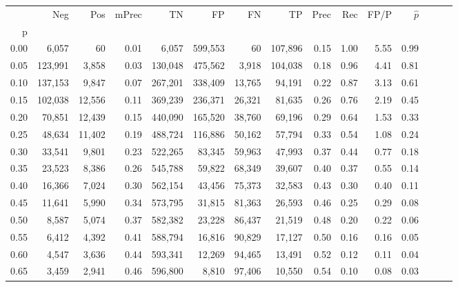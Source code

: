 \begin{tabular}{rrrrrrrrrrrrrrr}
\toprule
{} &      Neg &     Pos & mPrec &       TN &       FP &       FN &       TP &  Prec &   Rec &  FP/P & $\hat{p}$ \\
p    &          &         &       &          &          &          &          &       &       &       &           \\
\midrule
0.00 &    6,057 &      60 &  0.01 &    6,057 &  599,553 &       60 &  107,896 &  0.15 &  1.00 &  5.55 &      0.99 \\
0.05 &  123,991 &   3,858 &  0.03 &  130,048 &  475,562 &    3,918 &  104,038 &  0.18 &  0.96 &  4.41 &      0.81 \\
0.10 &  137,153 &   9,847 &  0.07 &  267,201 &  338,409 &   13,765 &   94,191 &  0.22 &  0.87 &  3.13 &      0.61 \\
0.15 &  102,038 &  12,556 &  0.11 &  369,239 &  236,371 &   26,321 &   81,635 &  0.26 &  0.76 &  2.19 &      0.45 \\
0.20 &   70,851 &  12,439 &  0.15 &  440,090 &  165,520 &   38,760 &   69,196 &  0.29 &  0.64 &  1.53 &      0.33 \\
0.25 &   48,634 &  11,402 &  0.19 &  488,724 &  116,886 &   50,162 &   57,794 &  0.33 &  0.54 &  1.08 &      0.24 \\
0.30 &   33,541 &   9,801 &  0.23 &  522,265 &   83,345 &   59,963 &   47,993 &  0.37 &  0.44 &  0.77 &      0.18 \\
0.35 &   23,523 &   8,386 &  0.26 &  545,788 &   59,822 &   68,349 &   39,607 &  0.40 &  0.37 &  0.55 &      0.14 \\
0.40 &   16,366 &   7,024 &  0.30 &  562,154 &   43,456 &   75,373 &   32,583 &  0.43 &  0.30 &  0.40 &      0.11 \\
0.45 &   11,641 &   5,990 &  0.34 &  573,795 &   31,815 &   81,363 &   26,593 &  0.46 &  0.25 &  0.29 &      0.08 \\
0.50 &    8,587 &   5,074 &  0.37 &  582,382 &   23,228 &   86,437 &   21,519 &  0.48 &  0.20 &  0.22 &      0.06 \\
0.55 &    6,412 &   4,392 &  0.41 &  588,794 &   16,816 &   90,829 &   17,127 &  0.50 &  0.16 &  0.16 &      0.05 \\
0.60 &    4,547 &   3,636 &  0.44 &  593,341 &   12,269 &   94,465 &   13,491 &  0.52 &  0.12 &  0.11 &      0.04 \\
0.65 &    3,459 &   2,941 &  0.46 &  596,800 &    8,810 &   97,406 &   10,550 &  0.54 &  0.10 &  0.08 &      0.03 \\

\end{tabular}
